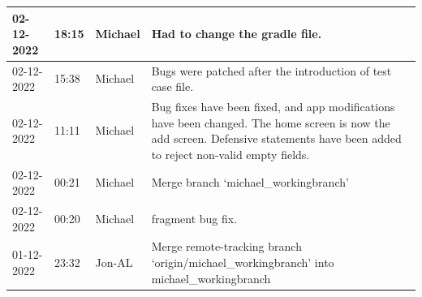 \documentclass[11pt]{article}
\begin{document}
\begin{center}
\begin{longtable}{|p{2cm}|l|p{2cm}|p{10.5cm}|}
            02-12-2022                                 & 18:15                              & Michael                                 & Had to change the gradle file.                                                                                                                                                                                                                                                                               \\ \hline
            02-12-2022                                 & 15:38                              & Michael                                 & Bugs were patched after the introduction of test case file.                                                                                                                                                                                                                                                  \\ \hline
            02-12-2022                                 & 11:11                              & Michael                                 & Bug fixes have been fixed, and app modifications have been changed. The home screen is now the add screen. Defensive statements have been added to reject non-valid empty fields.                                                                                                                            \\ \hline
            02-12-2022                                 & 00:21                              & Michael                                 & Merge branch `michael\_workingbranch'                                                                                                                                                                                                                                                                        \\ \hline
            02-12-2022                                 & 00:20                              & Michael                                 & fragment bug fix.                                                                                                                                                                                                                                                                                            \\ \hline
            01-12-2022                                 & 23:32                              & Jon-AL                                  & Merge remote-tracking branch `origin/michael\_workingbranch' into michael\_workingbranch                                                                                                                                                                                                                     \\ \hline

\end{longtable}
\end{center}
\end{document}
